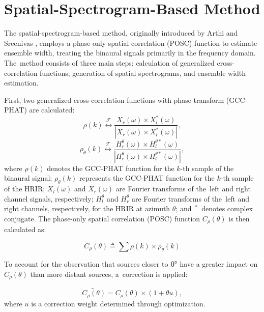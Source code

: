 \section{Spatial-Spectrogram-Based Method}
\label{sec:methods:spatial}

The spatial-spectrogram-based method, originally introduced by Arthi and Sreenivas \cite{arthi_binaural_2022}, employs a phase-only spatial correlation (POSC) function to estimate ensemble width, treating the binaural signals primarily in the frequency domain. The~method consists of three main steps: calculation of generalized cross-correlation functions, generation of spatial spectrograms, and ensemble width estimation.

First, two generalized cross-correlation functions with phase transform (GCC-PHAT) are calculated:
\begin{equation}
\rho(k) \stackrel{\mathcal{F}}{\longleftrightarrow} \frac{X_r(\omega) \times X_l^*(\omega)}{|X_r(\omega) \times X_l^*(\omega)|},
\end{equation}
\begin{equation}
\rho_\theta(k) \stackrel{\mathcal{F}}{\longleftrightarrow} \frac{H_r^\theta(\omega) \times H_l^{\theta*}(\omega)}{|H_r^\theta(\omega) \times H_l^{\theta*}(\omega)|},
\end{equation}
where $\rho(k)$ denotes the GCC-PHAT function for the \mbox{$k$-th} sample of the binaural signal; $\rho_\theta(k)$ represents the GCC-PHAT function for the $k$-th sample of the HRIR; $X_l(\omega)$ and $X_r(\omega)$ are Fourier transforms of the~left and right channel signals, respectively; $H_l^\theta$ and $H_r^\theta$ are Fourier transforms of the~left and right channels, respectively, for the HRIR at azimuth $\theta$; and~$^*$~denotes complex conjugate. The phase-only spatial correlation (POSC) function $C_\rho(\theta)$ is then calculated as:

\begin{equation}
C_\rho(\theta) \triangleq \sum \rho(k) \times \rho_\theta(k)
\end{equation}

To account for the observation that sources closer to $0\degree$ have a greater impact on $C_\rho(\theta)$ than more distant sources, a~correction is applied:

\begin{equation}
\widetilde{C_\rho(\theta)} = C_\rho(\theta) \times (1 + \theta u),
\end{equation}
where $u$ is a correction weight determined through optimization.

